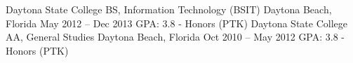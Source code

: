 \begin{cventries}
	\cventry
	{Daytona State College}
	{BS, Information Technology (BSIT)}
	{Daytona Beach, Florida}
	{May 2012 – Dec 2013}
	{GPA: 3.8 - Honors (PTK)}
	\cventry
	{Daytona State College}
	{AA, General Studies}
	{Daytona Beach, Florida}
	{Oct 2010 – May 2012}
	{GPA: 3.8 - Honors (PTK)}
\end{cventries}